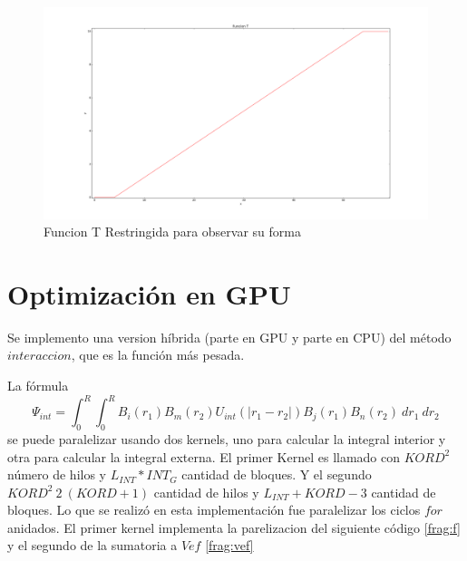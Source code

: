 \documentclass[a4paper,openright,12pt, oneside]{book}
\providecommand{\abs}[1]{\lvert#1\rvert}
\begin{document}
\begin{figure}[!htbp]
  \begin{center}
    \leavevmode

    \includegraphics[scale=0.15]{funcionT.png}

    \caption{Funcion T Restringida para observar su forma}
    \label{img:funciont}
  \end{center}
\end{figure}

\section{Optimizaci\'on en GPU}
Se implemento una version h\'ibrida (parte en GPU y parte en CPU) del m\'etodo $interaccion$, que es la funci\'on m\'as pesada.

La f\'ormula 
$$\Psi_{int} = \int_{0}^{R} \int_{0}^{R} B_i(r_1)B_m(r_2)U_{int}(\abs{r_1 - r_2})B_j(r_1)B_n(r_2)\ dr_1\ dr_2 $$
se puede paralelizar usando dos kernels, uno para calcular la integral interior y otra para calcular la integral externa.
El primer Kernel es llamado con $KORD^2$ n\'umero de hilos y $L_{INT}*INT_G$ cantidad de bloques. Y el segundo $KORD^{2}\ 2\ (KORD+1)$ cantidad de hilos y $L_{INT} + KORD - 3$ cantidad de bloques.
Lo que se realiz\'o en esta implementaci\'on fue paralelizar los ciclos $for$ anidados. El primer kernel implementa la parelizacion del siguiente c\'odigo \ref{frag:f} y el segundo de la sumatoria a $Vef$ \ref{frag:vef}
\end{document}
